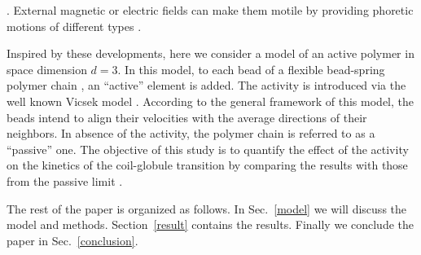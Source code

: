 \documentclass[aps,prx,reprint,showpacs,showkeys,noeprint,longbibliography]{revtex4-1} %
\begin{document}
\cite{jiang, biswas, daiki, ramirez}. 
External magnetic or electric fields can make them motile by providing phoretic motions of different types \cite{biswas, daiki}.
\par 
Inspired by these developments, here we consider a model of an active polymer in space 
dimension $d=3$. In this model, to each bead of a flexible bead-spring polymer chain \cite{milchev, majumder1, majumder3}, an ``active'' element 
is added. The activity is introduced via the well known Vicsek model \cite{vicsek,das1,paul1}. According to the general framework of this model, the beads intend to align their velocities with the average directions of their neighbors. In absence of the activity, the polymer chain is referred to as a ``passive'' one. The objective of this study is to quantify the 
effect of the activity on the kinetics of the coil-globule transition by comparing the results with those from the passive limit \cite{majumder1,christiansen, majumder3,majumder4}.
\par
The rest of the paper is organized as follows. 
In Sec.\ \ref{model} we will discuss the model and methods. 
Section\ \ref{result} contains the results. Finally we conclude the paper 
in Sec.\ \ref{conclusion}.
\end{document}
